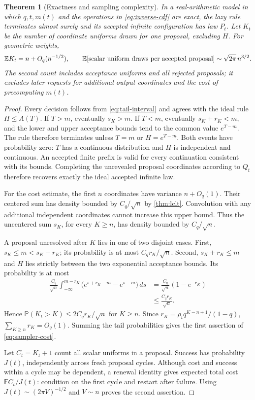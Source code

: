 \documentclass[11pt,a4paper]{article}
\numberwithin{equation}{section}
\newtheorem{theorem}{Theorem}[section]
\theoremstyle{definition}
\theoremstyle{remark}
\newcommand{\E}{\mathbb E}
\newcommand{\Pp}{\mathbb P}
\begin{document}
\begin{theorem}[Exactness and sampling complexity]\label{thm:sampler}
In a real-arithmetic model in which $q,t,m(t)$ and the operations in
\cref{eq:inverse-cdf} are exact, the lazy rule terminates almost
surely and its accepted infinite configuration has law $P_t$.
Let $K_t$ be the number of coordinate uniforms drawn for one
proposal, excluding $H$. For geometric weights,
\begin{equation}\label{eq:sampler-cost}
 \E K_t=n+O_q(n^{-1/2}),\qquad
 \E[\hbox{scalar uniform draws per accepted proposal}]
 \sim\sqrt{2\pi}\,n^{3/2}.
\end{equation}
The second count includes acceptance uniforms and all rejected
proposals; it excludes later requests for additional output
coordinates and the cost of precomputing $m(t)$.
\end{theorem}
\begin{proof}
Every decision follows from \cref{eq:tail-interval}
and agrees with the ideal rule $H\le A(T)$. If $T>m$, eventually
$s_K>m$. If $T<m$, eventually $s_K+r_K<m$, and the lower and upper
acceptance bounds tend to the common value $e^{T-m}$. The rule
therefore terminates unless $T=m$ or $H=e^{T-m}$. Both events have
probability zero: $T$ has a continuous distribution and $H$ is
independent and continuous. An accepted finite prefix is valid for
every continuation consistent with its bounds. Completing the
unrevealed proposal coordinates according to $Q_t$ therefore
recovers exactly the ideal accepted infinite law.

For the cost estimate, the first $n$ coordinates have variance
$n+O_q(1)$. Their centered sum has density bounded by $C_q/\sqrt n$
by \cref{thm:lclt}. Convolution with any additional independent
coordinates cannot increase this upper bound. Thus the uncentered
sum $s_K$, for every $K\ge n$, has density bounded by
$C_q/\sqrt n$.

A proposal unresolved after $K$ lies in one of two disjoint cases.
First, $s_K\le m<s_K+r_K$; its probability is at most
$C_qr_K/\sqrt n$. Second, $s_K+r_K\le m$ and $H$ lies strictly
between the two exponential acceptance bounds. Its probability is
at most
\begin{align*}
 \frac{C_q}{\sqrt n}\int_{-\infty}^{m-r_K}
   \bigl(e^{s+r_K-m}-e^{s-m}\bigr)\,ds
 &=\frac{C_q}{\sqrt n}(1-e^{-r_K})\\
 &\le\frac{C_qr_K}{\sqrt n}.
\end{align*}
Hence $\Pp(K_t>K)\le2C_qr_K/\sqrt n$ for $K\ge n$.
Since $r_K=\rho_tq^{K-n+1}/(1-q)$,
$\sum_{K\ge n}r_K=O_q(1)$. Summing the tail probabilities gives
the first assertion of \cref{eq:sampler-cost}.

Let $C_t=K_t+1$ count all scalar uniforms in a proposal. Success
has probability $J(t)$, independently across fresh proposal cycles.
Although cost and success within a cycle may be dependent, a
renewal identity gives expected total cost $\E C_t/J(t)$:
condition on the first cycle and restart after failure. Using
$J(t)\sim(2\pi V)^{-1/2}$ and $V\sim n$ proves the second
assertion.
\end{proof}
\end{document}
